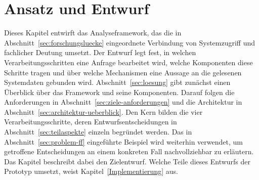 \chapter{Ansatz und Entwurf}
\label{Ansatz}


Dieses Kapitel entwirft das Analyseframework, das die in Abschnitt~\ref{sec:forschungsluecke} eingeordnete Verbindung von Systemzugriff und fachlicher Deutung umsetzt. Der Entwurf legt fest, in welchen Verarbeitungsschritten eine Anfrage bearbeitet wird, welche Komponenten diese Schritte tragen und über welche Mechanismen eine Aussage an die gelesenen Systemdaten gebunden wird. Abschnitt~\ref{sec:loesung} gibt zunächst einen Überblick über das Framework und seine Komponenten. Darauf folgen die Anforderungen in Abschnitt~\ref{sec:ziele-anforderungen} und die Architektur in Abschnitt~\ref{sec:architektur-ueberblick}. Den Kern bilden die vier Verarbeitungsschritte, deren Entwurfsentscheidungen in Abschnitt~\ref{sec:teilaspekte} einzeln begründet werden. Das in Abschnitt~\ref{sec:problem-ff} eingeführte Beispiel wird weiterhin verwendet, um getroffene Entscheidungen an einem konkreten Fall nachvollziehbar zu erläutern. Das Kapitel beschreibt dabei den Zielentwurf. Welche Teile dieses Entwurfs der Prototyp umsetzt, weist Kapitel~\ref{Implementierung} aus.

